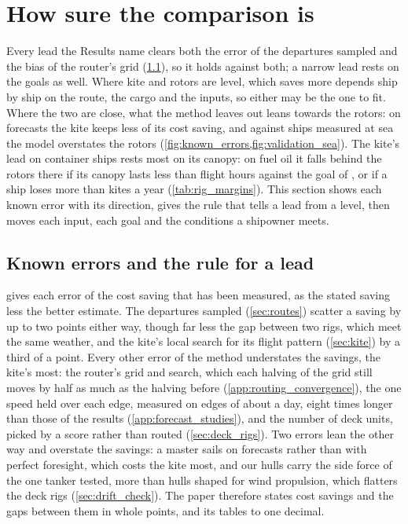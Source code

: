 \section{How sure the comparison is}
\label{sec:certainty}

Every lead the Results name clears both the error of the departures sampled and the bias of the router's grid (\cref{sec:res_robustness}), so it holds against both; a narrow lead rests on the goals as well. Where kite and rotors are level, which saves more depends ship by ship on the route, the cargo and the inputs, so either may be the one to fit. Where the two are close, what the method leaves out leans towards the rotors: on forecasts the kite keeps less of its cost saving, and against ships measured at sea the model overstates the rotors (\cref{fig:known_errors,fig:validation_sea}). The kite's lead on container ships rests most on its canopy: on fuel oil it falls behind the rotors there if its canopy lasts less than \NumKiteLifeLimitOilContainer{} flight hours against the goal of \NumCanopyLifeGoal{}, or if a ship loses more than \NumKiteLossLimitOilContainer{} kites a year (\cref{tab:rig_margins}). This section shows each known error with its direction, gives the rule that tells a lead from a level, then moves each input, each goal and the conditions a shipowner meets.

\subsection{Known errors and the rule for a lead}
\label{sec:res_robustness}

 gives each error of the cost saving that has been measured, as the stated saving less the better estimate. The departures sampled (\cref{sec:routes}) scatter a saving by up to two points either way, though far less the gap between two rigs, which meet the same weather, and the kite's local search for its flight pattern (\cref{sec:kite}) by a third of a point. Every other error of the method understates the savings, the kite's most: the router's grid and search, which each halving of the grid still moves by half as much as the halving before (\cref{app:routing_convergence}), the one speed held over each edge, measured on edges of about a day, eight times longer than those of the results (\cref{app:forecast_studies}), and the number of deck units, picked by a score rather than routed (\cref{sec:deck_rigs}). Two errors lean the other way and overstate the savings: a master sails on forecasts rather than with perfect foresight, which costs the kite most, and our hulls carry the side force of the one tanker tested, more than hulls shaped for wind propulsion, which flatters the deck rigs (\cref{sec:drift_check}). The paper therefore states cost savings and the gaps between them in whole points, and its tables to one decimal.

